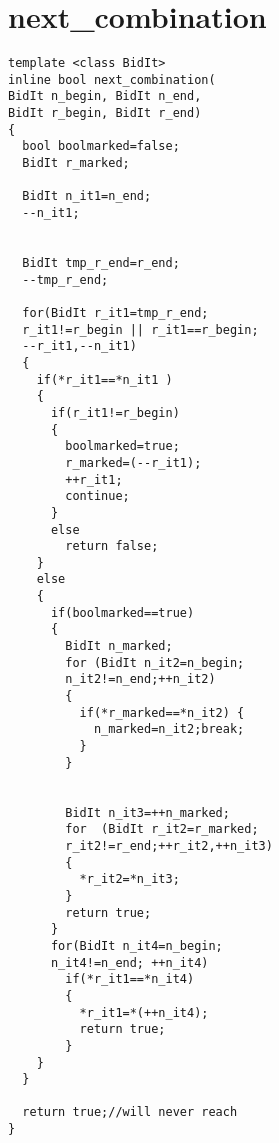 \section{next\_combination}
\label{app:nextcombination}
\begin{verbatim}
template <class BidIt>
inline bool next_combination(
BidIt n_begin, BidIt n_end,
BidIt r_begin, BidIt r_end)
{
  bool boolmarked=false;
  BidIt r_marked;

  BidIt n_it1=n_end;
  --n_it1;


  BidIt tmp_r_end=r_end;
  --tmp_r_end;

  for(BidIt r_it1=tmp_r_end;
  r_it1!=r_begin || r_it1==r_begin;
  --r_it1,--n_it1)
  {
    if(*r_it1==*n_it1 )
    { 
      if(r_it1!=r_begin)
      {
        boolmarked=true;
        r_marked=(--r_it1);
        ++r_it1;
        continue;
      }
      else
        return false;    
    }
    else
    {
      if(boolmarked==true)
      {
        BidIt n_marked;
        for (BidIt n_it2=n_begin;
        n_it2!=n_end;++n_it2)
        {
          if(*r_marked==*n_it2) {
            n_marked=n_it2;break;
          }
        }


        BidIt n_it3=++n_marked;  
        for  (BidIt r_it2=r_marked;
        r_it2!=r_end;++r_it2,++n_it3)
        {
          *r_it2=*n_it3;
        }
        return true;
      }
      for(BidIt n_it4=n_begin;
      n_it4!=n_end; ++n_it4)
        if(*r_it1==*n_it4)
        {
          *r_it1=*(++n_it4);
          return true;       
        }
    }
  }  

  return true;//will never reach
}
\end{verbatim}

